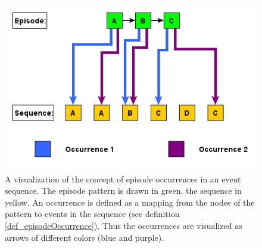 \begin{figure}[h]
	\centering
  	\includegraphics[width=\textwidth]{occurrenceExample}
	\caption[Episode Occurrences in a Sequence]{A visualization of the concept of episode occurrences in an event sequence. The episode pattern is drawn in green, the sequence in yellow. An occurrence is defined as a mapping from the nodes of the pattern to events in the sequence (see definition \ref{def_episodeOccurrence}). Thus the occurrences are visualized as arrows of different colors (blue and purple). }
	\label{fig_occurrenceExample}
\end{figure}


